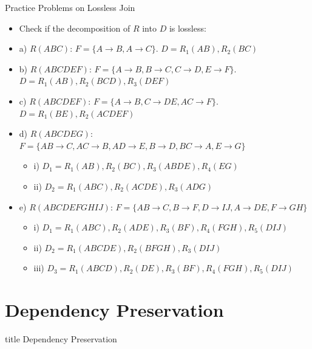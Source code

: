 \documentclass[aspectratio=169, xcolor=dvipsnames]{beamer}
\begin{document}
\begin{frame}{Practice Problems on Lossless Join}
    \begin{itemize}[<+->]
        \item Check if the decomposition of $R$ into $D$ is lossless:
        \item a) $R(ABC)$: $F = \{A \rightarrow B, A \rightarrow C\}$. $D = R_1(AB), R_2(BC)$
        \item b) $R(ABCDEF)$: $F = \{A \rightarrow B, B \rightarrow C, C \rightarrow D, E \rightarrow F\}$. $D = R_1(AB), R_2(BCD), R_3(DEF)$
        \item c) $R(ABCDEF)$: $F = \{A \rightarrow B, C \rightarrow DE, AC \rightarrow F\}$. $D = R_1(BE), R_2(ACDEF)$
        \item d) $R(ABCDEG)$: $F = \{AB \rightarrow C, AC \rightarrow B, AD \rightarrow E, B \rightarrow D, BC \rightarrow A, E \rightarrow G\}$
        \begin{itemize}
            \item[$\triangleright$] i) $D_1 = R_1(AB), R_2(BC), R_3(ABDE), R_4(EG)$
            \item[$\triangleright$] ii) $D_2 = R_1(ABC), R_2(ACDE), R_3(ADG)$
        \end{itemize}
        \item e) $R(ABCDEFGHIJ)$: $F = \{AB \rightarrow C, B \rightarrow F, D \rightarrow IJ, A \rightarrow DE, F \rightarrow GH\}$
        \begin{itemize}
            \item[$\triangleright$] i) $D_1 = R_1(ABC), R_2(ADE), R_3(BF), R_4(FGH), R_5(DIJ)$
            \item[$\triangleright$] ii) $D_2 = R_1(ABCDE), R_2(BFGH), R_3(DIJ)$
            \item[$\triangleright$] iii) $D_3 = R_1(ABCD), R_2(DE), R_3(BF), R_4(FGH), R_5(DIJ)$
        \end{itemize}
    \end{itemize}
\end{frame}

\section{Dependency Preservation}
\begin{frame}
  \vfill
  \centering
  \begin{beamercolorbox}[sep=8pt,center,shadow=true,rounded=true]{title}
    Dependency Preservation\par%
  \end{beamercolorbox}
  \vfill
\end{frame}
\end{document}
